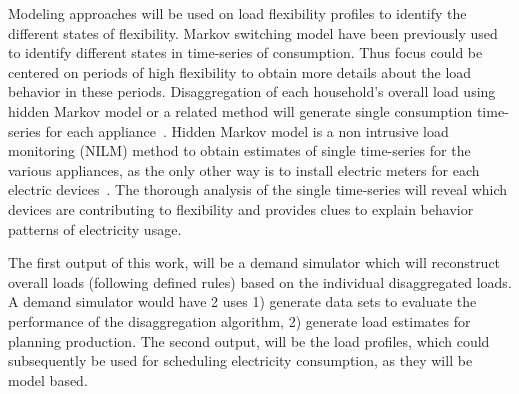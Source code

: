 \documentclass[fleqn,a4paper,twoside,10pt]{article}
\begin{document}
 	Modeling approaches will be used on load flexibility profiles to identify the different states of flexibility.
 	Markov switching model have been previously used to identify different states in time-series of consumption.
 	Thus focus could be centered on periods of high flexibility to obtain more details about the load behavior in these periods. 
 	Disaggregation of each household's overall load using hidden Markov model or a related method will generate single consumption time-series for each appliance~\cite{kolter2011}. 
 	Hidden Markov model is a non intrusive  load monitoring (NILM) method to obtain estimates of single time-series for the various appliances, as the only other way is to install electric meters for each electric devices~\cite{Armel2013}. 
 	The thorough analysis of the single time-series will reveal which devices are contributing to flexibility and provides clues to explain behavior patterns of electricity usage.

 	The first output of this work, will be a demand simulator which will reconstruct overall loads (following defined rules) based on the individual disaggregated loads. A demand simulator would have 2 uses 
 	1) generate data sets to evaluate the performance of the disaggregation algorithm, 2) generate load estimates for planning production.
 	The second output, will be the load profiles, which could subsequently be used for scheduling electricity consumption, as they will be model based.

	


\end{document}
